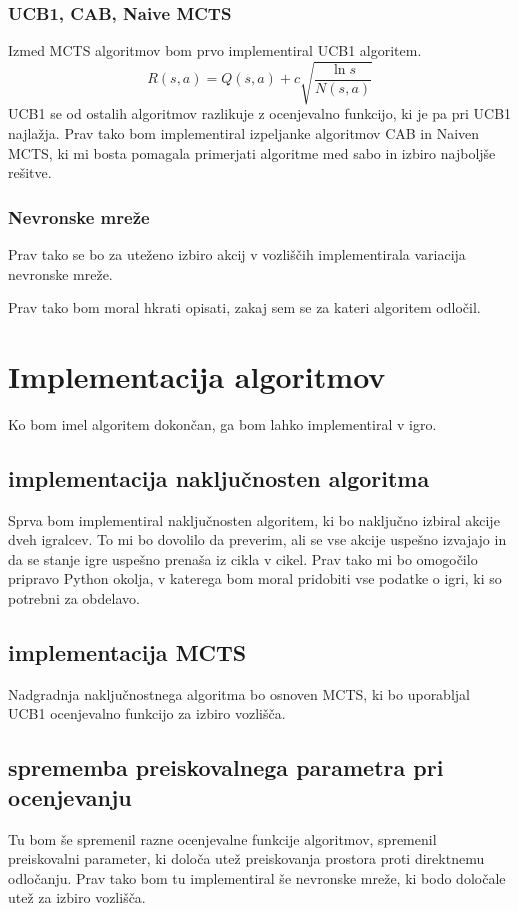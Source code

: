 \documentclass[a4paper, 12pt]{book}
\begin{document}
\subsection{UCB1, CAB, Naive MCTS}
Izmed MCTS algoritmov bom prvo implementiral UCB1 algoritem.
\begin{equation}
R(s,a) = Q(s,a) + c\sqrt{\dfrac{\ln{s}}{N(s,a)}}
\label{eq:1}
\end{equation}
UCB1 se od ostalih algoritmov razlikuje z ocenjevalno funkcijo, ki je pa pri UCB1 najlažja.
Prav tako bom implementiral izpeljanke algoritmov CAB in Naiven MCTS, ki mi bosta pomagala primerjati algoritme med sabo in izbiro najboljše rešitve.

\subsection{Nevronske mreže}
Prav tako se bo za uteženo izbiro akcij v vozliščih implementirala variacija nevronske mreže.


Prav tako bom moral hkrati opisati, zakaj sem se za kateri algoritem odločil.

\chapter{Implementacija algoritmov}
Ko bom imel algoritem dokončan, ga bom lahko implementiral v igro.
\section{implementacija naključnosten algoritma}
Sprva bom implementiral naključnosten algoritem, ki bo naključno izbiral akcije dveh igralcev. To mi bo dovolilo da preverim, ali se vse akcije uspešno izvajajo in da se stanje igre uspešno prenaša iz cikla v cikel. Prav tako mi bo omogočilo pripravo Python okolja, v katerega bom moral pridobiti vse podatke o igri, ki so potrebni za obdelavo.
\section{implementacija MCTS}
Nadgradnja naključnostnega algoritma bo osnoven MCTS, ki bo uporabljal UCB1 ocenjevalno funkcijo za izbiro vozlišča.
\section{sprememba preiskovalnega parametra pri ocenjevanju}
Tu bom še spremenil razne ocenjevalne funkcije algoritmov, spremenil preiskovalni parameter, ki določa utež preiskovanja prostora proti direktnemu odločanju.
Prav tako bom tu implementiral še nevronske mreže, ki bodo določale utež za izbiro vozlišča.
\end{document}
